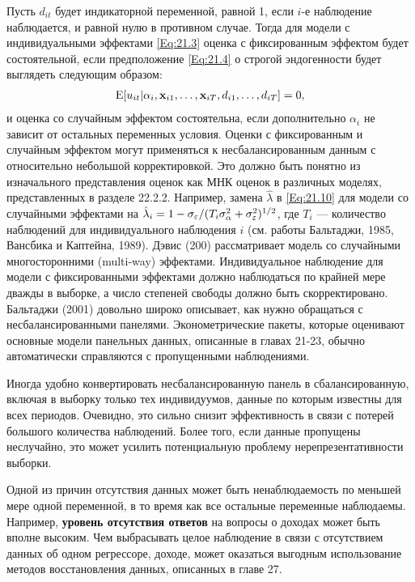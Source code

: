 Пусть $d_{it}$ будет индикаторной переменной, равной 1, если $i$-е наблюдение наблюдается, и равной нулю в противном случае. Тогда для модели с индивидуальными эффектами \ref{Eq:21.3} оценка с фиксированным эффектом будет состоятельной, если  предположение \ref{Eq:21.4} о строгой эндогенности будет выглядеть следующим образом:
 \begin{align}
\mathrm E[u_{it}|\alpha_i, \mathbf{x}_{i1}, \dots, \mathbf{x}_{iT}, d_{i1}, \dots, d_{iT}]=0,
\label{Eq:21.54}
\end{align}
и оценка со случайным эффектом состоятельна, если дополнительно $\alpha_i$ не зависит от остальных переменных условия. Оценки с фиксированным и случайным эффектом могут применяться к несбалансированным данным с относительно небольшой корректировкой. Это должно быть понятно из изначального представления оценок как МНК оценок в различных моделях, представленных в разделе 22.2.2. Например, замена $\hat{\lambda}$ в \ref{Eq:21.10} для модели со случайными эффектами на $\hat{\lambda}_i=1-\sigma_\varepsilon/(T_i\sigma^2_\alpha+\sigma^2_\varepsilon)^{1/2}$, где $T_i$ --- количество наблюдений для индивидуального наблюдения $i$ (см. работы Бальтаджи, 1985, Вансбика и Каптейна, 1989). Дэвис (200) рассматривает модель со случайными многосторонними (multi-way) эффектами. Индивидуальное наблюдение для модели с фиксированными эффектами должно наблюдаться по крайней мере дважды в выборке, а число степеней свободы должно быть скорректировано. Бальтаджи (2001) довольно широко описывает, как нужно обращаться с несбалансированными панелями. Эконометрические пакеты, которые оценивают основные  модели панельных данных, описанные в главах 21-23, обычно автоматически справляются с пропущенными наблюдениями.

Иногда удобно конвертировать несбалансированную панель в сбалансированную, включая в выборку только тех индивидуумов, данные по которым известны для всех периодов. Очевидно, это сильно снизит эффективность в связи с потерей большого количества наблюдений. Более того, если данные пропущены неслучайно, это может усилить потенциальную проблему нерепрезентативности выборки.

Одной из причин отсутствия данных может быть ненаблюдаемость по меньшей мере одной переменной, в то время как все остальные переменные наблюдаемы. Например, \textbf{уровень отсутствия ответов} на вопросы о доходах может быть вполне высоким. Чем выбрасывать целое наблюдение в связи с отсутствием данных об одном регрессоре, доходе, может оказаться выгодным использование методов восстановления данных, описанных в главе 27.

